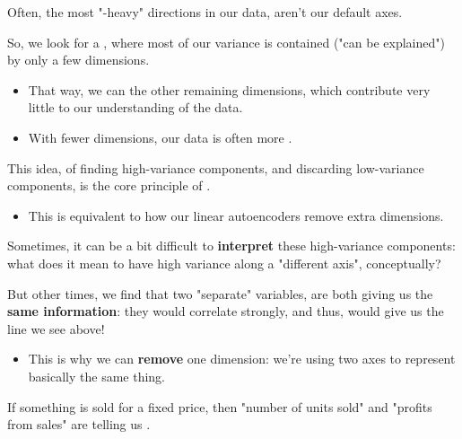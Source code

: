             \begin{concept}
                Often, the most "-heavy" directions in our data, aren't our default axes.

                So, we look for a , where most of our variance is contained ("can be explained") by only a few dimensions.

                \begin{itemize}
                    \item That way, we can  the other remaining dimensions, which contribute very little to our understanding of the data.
                    \item With fewer dimensions, our data is often more .
                \end{itemize}

                This idea, of finding high-variance components, and discarding low-variance components, is the core principle of .

                \begin{itemize}
                    \item This is equivalent to how our linear autoencoders remove extra dimensions.
                \end{itemize}
            \end{concept}

            Sometimes, it can be a bit difficult to \textbf{interpret} these high-variance components: what does it mean to have high variance along a "different axis", conceptually?

            But other times, we find that two "separate" variables, are both giving us the \textbf{same information}: they would correlate strongly, and thus, would give us the line we see above!

            \begin{itemize}
                \item This is why we can \textbf{remove} one dimension: we're using two axes to represent basically the same thing.
            \end{itemize}

            \miniex If something is sold for a fixed price, then "number of units sold" and "profits from sales" are telling us .

